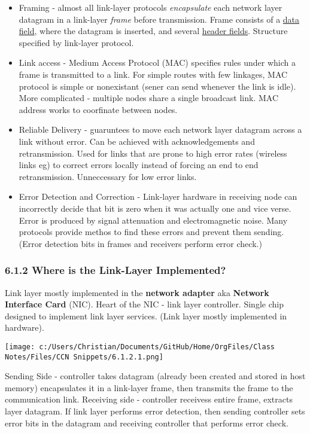 \documentclass[11pt]{article}
\begin{document}
\begin{itemize}
\item Framing - almost all link-layer protocols \emph{encapsulate} each network layer datagram in a link-layer \emph{frame} before transmission. Frame consists of a \uline{data field}, where the datagram is inserted, and several \uline{header fields}. Structure specified by link-layer protocol.
\item Link access - Medium Access Protocol (MAC) specifies rules under which a frame is transmitted to a link. For simple routes with few linkages, MAC protocol is simple or nonexistant (sener can send whenever the link is idle). More complicated - multiple nodes share a single broadcast link. MAC address works to coorfinate between nodes.
\item Reliable Delivery - guaruntees to move each network layer datagram across a link without error. Can be achieved with acknowledgements and retransmission. Used for links that are prone to high error rates (wireless links eg) to correct errors locally instead of forcing an end to end retransmission. Unneccessary for low error links.
\item Error Detection and Correction - Link-layer hardware in receiving node can incorrectly decide that bit is zero when it was actually one and vice verse. Error is produced by signal attenuation and electromagnetic noise. Many protocols provide methos to find these errors and prevent them sending. (Error detection bits in frames and receivers perform error check.)
\end{itemize}

\subsubsection{6.1.2 Where is the Link-Layer Implemented?}
\label{sec:orga73d5e4}

Link layer mostly implemented in the \textbf{network adapter} aka \textbf{Network Interface Card} (NIC). Heart of the NIC - link layer controller. Single chip designed to implement link layer services. (Link layer mostly implemented in hardware).
\begin{figure*}
\centering
\texttt{[image: c:/Users/Christian/Documents/GitHub/Home/OrgFiles/Class Notes/Files/CCN Snippets/6.1.2.1.png]}
\end{figure*}

Sending Side - controller takes datagram (already been created and stored in host memory) encapsulates it in a link-layer frame, then transmits the frame to the communication link. Receiving side - controller receivess entire frame, extracts layer datagram. If link layer performs error detection, then sending controller sets error bits in the datagram and receiving controller that performs error check.
\end{document}
